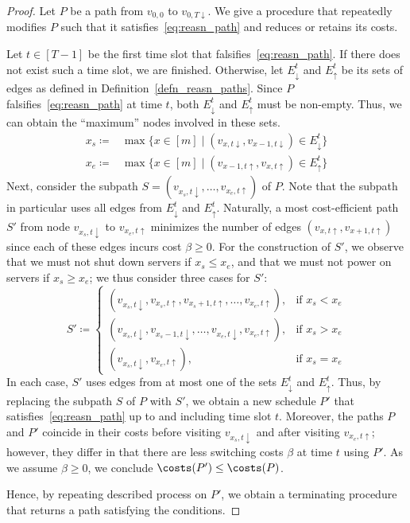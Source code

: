 \begin{proof}
Let $P$ be a path from $v_{0,0}$ to $v_{0,T\downarrow}$. We give a procedure that repeatedly modifies $P$ such that it satisfies~\eqref{eq:reasn_path} and reduces or retains its costs. 

Let $t\in[T-1]$ be the first time slot that falsifies~\eqref{eq:reasn_path}. If there does not exist such a time slot, we are finished. Otherwise, let $E_\downarrow^t$ and $E_\uparrow^t$ be its sets of edges as defined in Definition~\ref{defn_reasn_paths}. Since $P$ falsifies~\eqref{eq:reasn_path} at time $t$, both $E_\downarrow^t$ and $E_\uparrow^t$ must be non-empty. Thus, we can obtain the ``maximum'' nodes involved in these sets.
\begin{align*}
	x_s\coloneqq&\max\bigl\{x\in[m]\mid (v_{x,t\downarrow},v_{x-1,t\downarrow})\in E_\downarrow^t\bigr\}\\
	x_e\coloneqq&\max\bigl\{x\in[m]\mid (v_{x-1,t\uparrow},v_{x,t\uparrow})\in E_\uparrow^t\bigr\}
\end{align*}
Next, consider the subpath $S=(v_{x_s,t\downarrow},\dotsc,v_{x_e,t\uparrow})$ of $P$. Note that the subpath in particular uses all edges from $E_\downarrow^t$ and $E_\uparrow^t$.
Naturally, a most cost-efficient path $S'$ from node $v_{x_s,t\downarrow}$ to $v_{x_e,t\uparrow}$ minimizes the number of edges $(v_{x,t\uparrow},v_{x+1,t\uparrow})$ since each of these edges incurs cost $\beta\ge 0$. For the construction of $S'$, we observe that we must not shut down servers if $x_s\le x_e$, and that we must not power on servers if $x_s\ge x_e$; we thus consider three cases for $S'$:
\begin{equation*}
	S'\coloneqq
	\begin{cases}
		(v_{x_s,t\downarrow},v_{x_s,t\uparrow},v_{x_s+1,t\uparrow},\dotsc,v_{x_e,t\uparrow}), & \text{if $x_s< x_e$}\\
		(v_{x_s,t\downarrow},v_{x_s-1,t\downarrow},\dotsc,v_{x_e,t\downarrow},v_{x_e,t\uparrow}), & \text{if $x_s>x_e$}\\
		(v_{x_s,t\downarrow},v_{x_e,t\uparrow}), & \text{if $x_s=x_e$}
	\end{cases}
\end{equation*}
In each case, $S'$ uses edges from at most one of the sets $E_\downarrow^t$ and $E_\uparrow^t$. Thus, by replacing the subpath $S$ of $P$ with $S'$, we obtain a new schedule $P'$ that satisfies~\eqref{eq:reasn_path} up to and including time slot $t$. Moreover, the paths $P$ and $P'$ coincide in their costs before visiting $v_{x_s,t\downarrow}$ and after visiting $v_{x_e,t\uparrow}$; however, they differ in that there are less switching costs $\beta$ at time $t$ using $P'$. As we assume $\beta\ge0$, we conclude $\costs(P')\le \costs(P)$.

Hence, by repeating described process on $P'$, we obtain a terminating procedure that returns a path satisfying the conditions.
\end{proof}
